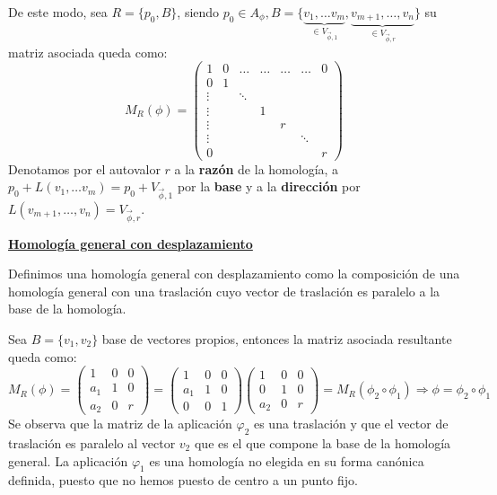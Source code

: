 \documentclass[10pt,a4paper,openright]{book}
\begin{document}
De este modo, sea $R = \{p_0, B\}$, siendo $p_0 \in A_\phi, B = \{\underbrace{ v_1, \ldots v_m}_{\in V_{\vec{\phi}, 1}}, \underbrace{v_{m+1}, \ldots, v_n}_{\in V_{\vec{\phi}, r}}\}$ su matriz asociada queda como:
$$M_{R} (\phi) = \left(\begin{array}{c|cccccc}
1  & 0 &  \ldots & \ldots & \ldots & \ldots& 0 \\
\hline
0  & 1 & & & & & \\
\vdots & & \ddots & & & & \\
\vdots &  & & 1 & & \\
\vdots &  & &  & r & \\
\vdots & & & & & \ddots & \\
0 & & & & & &  r
\end{array}
\right)$$
Denotamos por el autovalor $r$ a la \textbf{razón} de la homología, a $p_0 + L(v_1, \ldots v_m) = p_0 + V_{\vec{\phi}, 1}$ por la \textbf{base} y a la \textbf{dirección} por $L(v_{m+1}, \ldots, v_n) =  V_{\vec{\phi}, r}$.

\underline{\textbf{Homología general con desplazamiento}}

Definimos una homología general con desplazamiento como la composición de una homología general con una traslación cuyo vector de traslación es paralelo a la base de la homología.

Sea $B = \{v_1, v_2\}$ base de vectores propios, entonces la matriz asociada resultante queda como:
$$M_R (\phi) = \begin{pmatrix} 1 & 0 & 0 \\ a_1 & 1 & 0 \\ a_2 & 0 & r \end{pmatrix} = \left(\begin{array}{c|cc}
1  & 0 & 0 \\
\hline
a_1 & 1 &  0 \\
0 & 0 &  1
\end{array}
\right) \left(\begin{array}{c|cc}
1  & 0 & 0 \\
\hline
0 & 1 &  0 \\
a_2 & 0 &  r
\end{array}
\right) = M_R (\phi_2 \circ \phi_1) \Rightarrow \phi = \phi_2 \circ \phi_1 $$
Se observa que la matriz de la aplicación $\varphi_2$ es una traslación y que el vector de traslación es paralelo al vector $v_2$ que es el que compone la base de la homología general. La aplicación $\varphi_1$ es una homología no elegida en su forma canónica definida, puesto que no hemos puesto de centro a un punto fijo.
\end{document}
